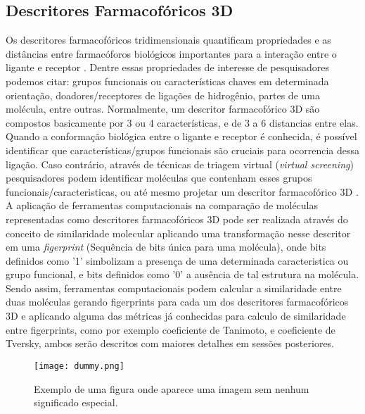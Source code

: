 \subsection{Descritores Farmacofóricos 3D}
Os descritores farmacofóricos tridimensionais quantificam propriedades e as distâncias entre  farmacóforos biológicos importantes para a interação entre o ligante e receptor  \cite{bajorath2004chemoinformatics}. Dentre essas propriedades de interesse de pesquisadores podemos citar: grupos funcionais ou características chaves em determinada orientação, doadores/receptores de ligações de hidrogênio, partes de uma molécula, entre outras. Normalmente, um descritor farmacofórico 3D são compostos basicamente por 3 ou 4 características, e de 3 a 6 distancias entre elas. 
Quando a conformação biológica entre o ligante e receptor é conhecida, é possível identificar     
que características/grupos funcionais são cruciais para ocorrencia dessa ligação. Caso contrário, através de técnicas de triagem virtual (\textit{virtual screening}) pesquisadores podem identificar moléculas que contenham esses grupos funcionais/caracteristicas, ou até mesmo projetar um descritor farmacofórico 3D \cite{bajorath2004chemoinformatics}. 
A aplicação de ferramentas computacionais na comparação de moléculas representadas como descritores farmacofóricos 3D pode ser realizada através do conceito de similaridade molecular aplicando uma transformação nesse descritor em uma \textit{figerprint} (Sequência de bits única para uma molécula), onde bits definidos como '1' simbolizam a presença de uma determinada caracteristica ou grupo funcional, e bits definidos como '0' a ausência de tal estrutura na molécula. Sendo assim, ferramentas computacionais podem calcular a similaridade entre duas moléculas gerando figerprints para cada um dos descritores farmacofóricos 3D e aplicando alguma das métricas já conhecidas para calculo de similaridade entre figerprints, como por exemplo coeficiente de Tanimoto, e coeficiente de Tversky, ambos serão descritos com maiores detalhes em sessões posteriores.          

     

 

\begin{figure}[!htb]
	\centering
	\caption[Exemplo de uma figura]{Exemplo de uma figura onde aparece uma imagem sem nenhum significado especial.}
	\texttt{[image: dummy.png]} %
	\label{fig:dummy}
\end{figure}